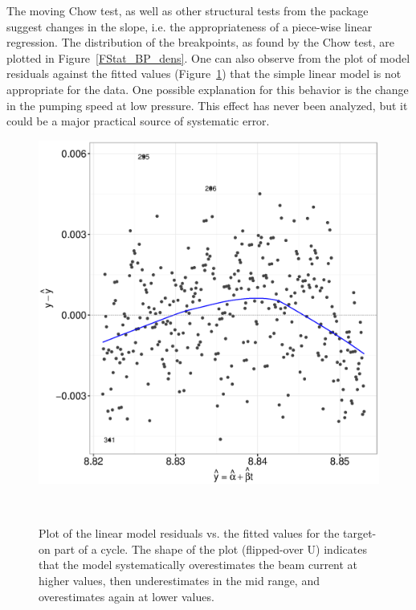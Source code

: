\documentclass{article}
\begin{document}
The moving Chow test, as well as other structural tests from the package~\cite{RStrucchange} suggest changes in the slope, i.e. the appropriateness of a piece-wise linear regression. The distribution of the breakpoints, as found by the Chow test, are plotted in Figure~\ref{FStat_BP_dens}. One can also observe from the plot of model residuals against the fitted values (Figure~\ref{fig:RvF-u17}) that the simple linear model is not appropriate for the data. One possible explanation for this behavior is the change in the pumping speed at low pressure. This effect has never been analyzed, but it could be a major practical source of systematic error.

\begin{figure}[h]
	\centering
	\begin{minipage}[t]{.5\textwidth}
		\centering
			\includegraphics[scale=.5]{Res_VS_Fit_2016-17.eps}
			\caption{Plot of the linear model residuals vs. the fitted values for the target-on part of a cycle. The shape of the plot (flipped-over U) indicates that the model systematically overestimates the beam current at higher values, then underestimates in the mid range, and overestimates again at lower values.\label{fig:RvF-u17}}
	\end{minipage}~~~~%
	\begin{minipage}[t]{.5\textwidth}
		\centering

\end{minipage}
\end{figure}
\end{document}

